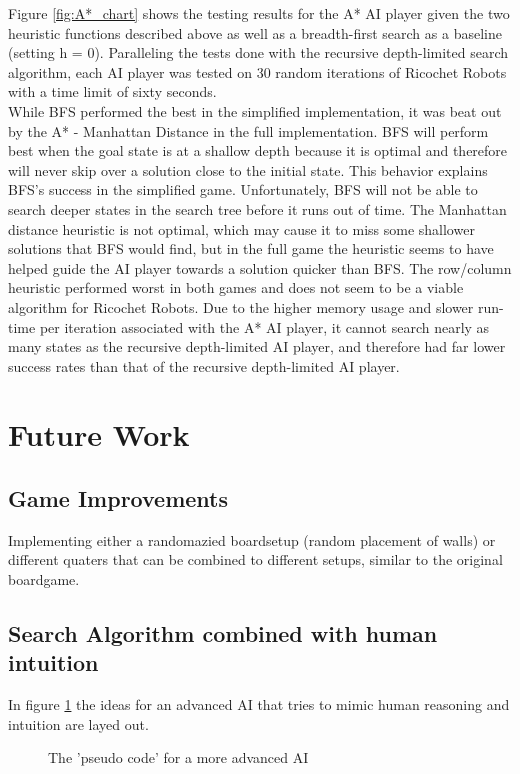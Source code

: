 \documentclass[a4paper,10pt]{article}
\begin{document}
  Figure \ref{fig:A*_chart} shows the testing results for the A* AI player given the two heuristic functions described above as well as a breadth-first search as a
  baseline (setting h = 0).  Paralleling the tests done with the recursive depth-limited search algorithm, each AI player was tested on 30 random iterations of Ricochet
  Robots with a time limit of sixty seconds. \\
  While BFS performed the best in the simplified implementation, it was beat out by the A* - Manhattan Distance in the full implementation.  BFS will perform best when
  the goal state is at a shallow depth because it is optimal and therefore will never skip over a solution close to the initial state.  This behavior explains BFS's
  success in the simplified game.  Unfortunately, BFS will not be able to search deeper states in the search tree before it runs out of time.  The Manhattan distance
  heuristic is not optimal, which may cause it to miss some shallower solutions that BFS would find, but in the full game the heuristic seems to have helped guide the AI
  player towards a solution quicker than BFS.  The row/column heuristic performed worst in both games and does not seem to be a viable algorithm for Ricochet Robots.
  Due to the higher memory usage and slower run-time per iteration associated with the A* AI player, it cannot search nearly as many states as the recursive depth-limited
  AI player, and therefore had far lower success rates than that of the recursive depth-limited AI player.

\section{Future Work}
\label{sec:futureWork}

  \subsection{Game Improvements}
  Implementing either a randomazied boardsetup (random placement of walls) or different quaters that can be combined to different setups, similar to the original boardgame.

  \subsection{Search Algorithm combined with human intuition}
  In figure \ref{fig:pseudo} the ideas for an advanced AI that tries to mimic human reasoning and intuition are layed out. 
  \begin{figure}[!htb]
  \caption{The 'pseudo code' for a more advanced AI}
  \label{fig:pseudo}
  \end{figure}
\end{document}
